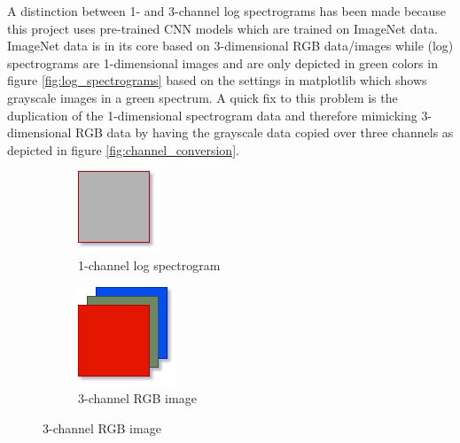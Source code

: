 \documentclass{article}
\theoremstyle{definition}
\theoremstyle{remark}
\begin{document}
A distinction between 1- and 3-channel log spectrograms has been made because this project uses pre-trained CNN models which are trained on ImageNet data. ImageNet data is in its core based on 3-dimensional RGB data/images while (log) spectrograms are 1-dimensional images and are only depicted in green colors in figure \ref{fig:log_spectrograms} based on the settings in matplotlib which shows grayscale images in a green spectrum. A quick fix to this problem is the duplication of the 1-dimensional spectrogram data and therefore mimicking 3-dimensional RGB data by having the grayscale data copied over three channels as depicted in figure \ref{fig:channel_conversion}.



\begin{figure}[h!]
\centering
\begin{subfigure}{.34\textwidth}
  \centering
  \includegraphics[width=0.5\linewidth]{img/grayscale.png}
  \caption{1-channel log spectrogram}
  \label{fig:sub1}
\end{subfigure}%
\begin{subfigure}{.34\textwidth}
  \centering
  \includegraphics[width=0.5\linewidth]{img/rgb.png}
  \caption{3-channel RGB image}
  \label{fig:sub2}
\end{subfigure}

\end{figure}
\end{document}
